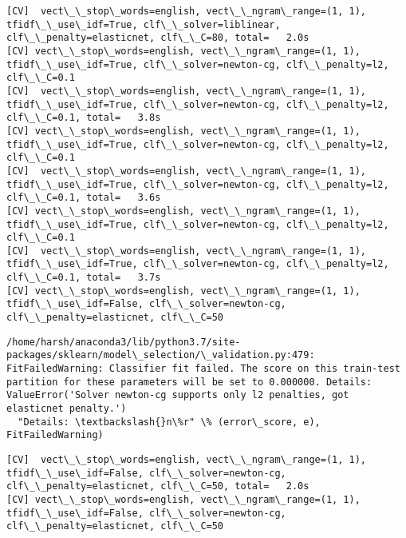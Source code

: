 \documentclass[11pt]{article}
\begin{document}
    \begin{Verbatim}[commandchars=\\\{\}]
[CV]  vect\_\_stop\_words=english, vect\_\_ngram\_range=(1, 1), tfidf\_\_use\_idf=True, clf\_\_solver=liblinear, clf\_\_penalty=elasticnet, clf\_\_C=80, total=   2.0s
[CV] vect\_\_stop\_words=english, vect\_\_ngram\_range=(1, 1), tfidf\_\_use\_idf=True, clf\_\_solver=newton-cg, clf\_\_penalty=l2, clf\_\_C=0.1 
[CV]  vect\_\_stop\_words=english, vect\_\_ngram\_range=(1, 1), tfidf\_\_use\_idf=True, clf\_\_solver=newton-cg, clf\_\_penalty=l2, clf\_\_C=0.1, total=   3.8s
[CV] vect\_\_stop\_words=english, vect\_\_ngram\_range=(1, 1), tfidf\_\_use\_idf=True, clf\_\_solver=newton-cg, clf\_\_penalty=l2, clf\_\_C=0.1 
[CV]  vect\_\_stop\_words=english, vect\_\_ngram\_range=(1, 1), tfidf\_\_use\_idf=True, clf\_\_solver=newton-cg, clf\_\_penalty=l2, clf\_\_C=0.1, total=   3.6s
[CV] vect\_\_stop\_words=english, vect\_\_ngram\_range=(1, 1), tfidf\_\_use\_idf=True, clf\_\_solver=newton-cg, clf\_\_penalty=l2, clf\_\_C=0.1 
[CV]  vect\_\_stop\_words=english, vect\_\_ngram\_range=(1, 1), tfidf\_\_use\_idf=True, clf\_\_solver=newton-cg, clf\_\_penalty=l2, clf\_\_C=0.1, total=   3.7s
[CV] vect\_\_stop\_words=english, vect\_\_ngram\_range=(1, 1), tfidf\_\_use\_idf=False, clf\_\_solver=newton-cg, clf\_\_penalty=elasticnet, clf\_\_C=50 

    \end{Verbatim}

    \begin{Verbatim}[commandchars=\\\{\}]
/home/harsh/anaconda3/lib/python3.7/site-packages/sklearn/model\_selection/\_validation.py:479: FitFailedWarning: Classifier fit failed. The score on this train-test partition for these parameters will be set to 0.000000. Details: 
ValueError('Solver newton-cg supports only l2 penalties, got elasticnet penalty.')
  "Details: \textbackslash{}n\%r" \% (error\_score, e), FitFailedWarning)

    \end{Verbatim}

    \begin{Verbatim}[commandchars=\\\{\}]
[CV]  vect\_\_stop\_words=english, vect\_\_ngram\_range=(1, 1), tfidf\_\_use\_idf=False, clf\_\_solver=newton-cg, clf\_\_penalty=elasticnet, clf\_\_C=50, total=   2.0s
[CV] vect\_\_stop\_words=english, vect\_\_ngram\_range=(1, 1), tfidf\_\_use\_idf=False, clf\_\_solver=newton-cg, clf\_\_penalty=elasticnet, clf\_\_C=50 

    \end{Verbatim}
\end{document}
